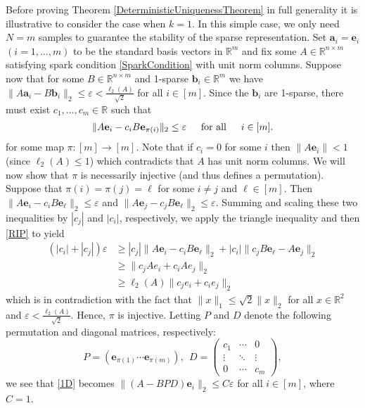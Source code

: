 \documentclass[journal, onecolumn]{IEEEtran}
\begin{document}

Before proving Theorem \ref{DeterministicUniquenessTheorem} in full generality it is illustrative to consider the case when $k=1$. In this simple case, we only need $N = m$ samples to guarantee the stability of the sparse representation. Set $\mathbf{a}_i = \mathbf{e}_i$ $(i = 1, \ldots, m)$ to be the standard basis vectors in $\mathbb{R}^m$ and fix some $A \in \mathbb{R}^{n \times m}$ satisfying spark condition \eqref{SparkCondition} with unit norm columns. Suppose now that for some $B \in \mathbb{R}^{n \times m}$ and 1-sparse $\mathbf{b}_i \in \mathbb{R}^m$ we have  $\|A\mathbf{a}_i - B\mathbf{b}_i\|_2 \leq \varepsilon < \frac{\ell_2(A)}{\sqrt{2}}$ for all $i \in [m]$. Since the $\mathbf{b}_i$ are 1-sparse, there must exist $c_1, \ldots, c_m \in \mathbb{R}$ such that 
\begin{align}\label{1D}
\|A\mathbf{e}_i - c_iB\mathbf{e}_{\pi(i)}\|_2 \leq \varepsilon \indent \text{for all} \indent i \in [m].
\end{align}
for some map $\pi: [m] \to [m]$. 
Note that if $c_i = 0$ for some $i$ then $\|A\mathbf{e}_i\| < 1$ (since $\ell_2(A) \leq 1$) which contradicts that $A$ has unit norm columns. We will now show that $\pi$ is necessarily injective (and thus defines a permutation). Suppose that $\pi(i) = \pi(j) = \ell$ for some $i \neq j$ and $\ell \in [m]$. Then $\|A\mathbf{e}_i - c_iB\mathbf{e}_{\ell}\|_2  \leq \varepsilon$ and $\|A\mathbf{e}_j - c_jB\mathbf{e}_{\ell}\|_2 \leq \varepsilon$. Summing and scaling these two inequalities by $|c_j|$ and $|c_i|$, respectively, we apply the triangle inequality and then \eqref{RIP} to yield
\begin{align*}
(|c_i| + |c_j|) \varepsilon
&\geq |c_j|\|A\mathbf{e}_i - c_iB\mathbf{e}_{\ell}\|_2 + |c_i|\|c_jB\mathbf{e}_{\ell} - A\mathbf{e}_j\|_2 \\
&\geq \|c_jAe_i + c_iAe_j\|_2 \\
&\geq \ell_2(A)\|c_je_i + c_ie_j\|_2
\end{align*}
%
which is in contradiction with the fact that $\|x\|_1 \leq \sqrt{2}\|x\|_2$ for all $x \in \mathbb{R}^2$ and $\varepsilon < \frac{\ell_2(A)}{\sqrt{2}}$. Hence, $\pi$ is injective. Letting $P$ and $D$ denote the following permutation and diagonal matrices, respectively:
\begin{equation}\label{PandD}
P = \left( \mathbf{e}_{\pi(1)} \cdots \mathbf{e}_{\pi(m)}\right), \ \ D = \left(\begin{array}{ccc}c_1 & \cdots & 0 \\\vdots & \ddots & \vdots \\0 & \cdots & c_m\end{array}\right),
\end{equation}
%
we see that \eqref{1D} becomes $\|(A - BPD)\mathbf{e}_i\|_2 \leq C\varepsilon$ for all $i \in [m]$, where $C = 1$. 
\end{document}
